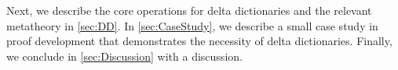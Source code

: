 



%
%
Next, we describe the core operations for delta dictionaries and the relevant metatheory in \autoref{sec:DD}.
%
In \autoref{sec:CaseStudy}, we describe a small case study in proof development that demonstrates the necessity of delta dictionaries.
%
Finally, we conclude in \autoref{sec:Discussion} with a discussion. %
%


